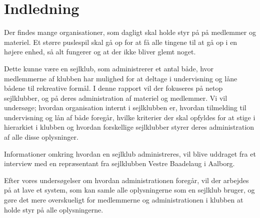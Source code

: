 \chapter{Indledning}\label{chap:indledning}

\cbstart

Der findes mange organisationer, som dagligt skal holde styr på på medlemmer og materiel. Et større
puslespil skal gå op for at få alle tingene til at gå op i en højere enhed, så alt fungerer og at der ikke
bliver glemt noget.

Dette kunne være en sejlklub, som administrerer et antal både, hvor medlemmerne af klubben har mulighed for at
deltage i undervisning og låne bådene til rekreative formål. I denne rapport vil der fokuseres på netop
sejlklubber, og på deres administration af materiel og medlemmer. Vi vil undersøge; hvordan organisation
internt i sejlklubben er, hvordan tilmelding til undervisning og lån af både foregår, hvilke kriterier der
skal opfyldes for at stige i hierarkiet i klubben og hvordan forskellige sejlklubber styrer deres
administration af alle disse oplysninger.

Informationer omkring hvordan en sejlklub administreres, vil blive uddraget fra et interview med en
repræsentant fra sejlklubben Vestre Baadelaug i Aalborg.

Efter vores undersøgelser om hvordan administrationen foregår, vil der arbejdes på at lave et system, som kan
samle alle oplysningerne som en sejlklub bruger, og gøre det mere overskueligt for medlemmerne og
administrationen i klubben at holde styr på alle oplysningerne.

\cbend
